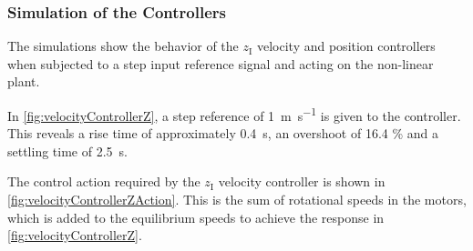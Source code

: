 \subsubsection{Simulation of the Controllers}
The simulations show the behavior of the $z_{\mathrm{I}}$ velocity and position controllers when subjected to a step input reference signal and acting on the non-linear plant.

In \autoref{fig:velocityControllerZ}, a step reference of \SI{1}{m s^{-1}} is given to the controller. This reveals a rise time of approximately \SI{0.4}{s}, an overshoot of 16.4 \% and a settling time of \SI{2.5}{s}.

The control action required by the $z_{\mathrm{I}}$ velocity controller is shown in \autoref{fig:velocityControllerZAction}. This is the sum of rotational speeds in the motors, which is added to the equilibrium speeds to achieve the response in \autoref{fig:velocityControllerZ}.

